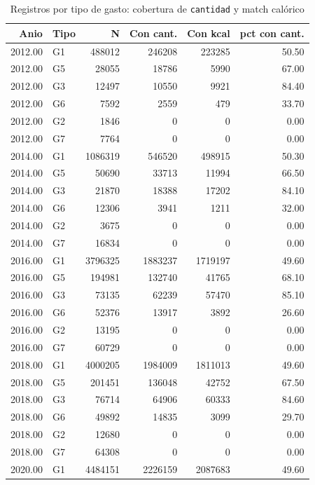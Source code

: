 \begin{table}[ht]
\centering
\caption{Registros por tipo de gasto: cobertura de \texttt{cantidad} y match cal\'orico} 
\label{tab:17a_tipo_gasto_cobertura}
\begin{tabular}{rlrrrr}
  \toprule
Anio & Tipo & N & Con cant. & Con kcal & pct con cant. \\ 
  \midrule
2012.00 & G1 & 488012 & 246208 & 223285 & 50.50 \\ 
  2012.00 & G5 & 28055 & 18786 & 5990 & 67.00 \\ 
  2012.00 & G3 & 12497 & 10550 & 9921 & 84.40 \\ 
  2012.00 & G6 & 7592 & 2559 & 479 & 33.70 \\ 
  2012.00 & G2 & 1846 &   0 &   0 & 0.00 \\ 
  2012.00 & G7 & 7764 &   0 &   0 & 0.00 \\ 
  2014.00 & G1 & 1086319 & 546520 & 498915 & 50.30 \\ 
  2014.00 & G5 & 50690 & 33713 & 11994 & 66.50 \\ 
  2014.00 & G3 & 21870 & 18388 & 17202 & 84.10 \\ 
  2014.00 & G6 & 12306 & 3941 & 1211 & 32.00 \\ 
  2014.00 & G2 & 3675 &   0 &   0 & 0.00 \\ 
  2014.00 & G7 & 16834 &   0 &   0 & 0.00 \\ 
  2016.00 & G1 & 3796325 & 1883237 & 1719197 & 49.60 \\ 
  2016.00 & G5 & 194981 & 132740 & 41765 & 68.10 \\ 
  2016.00 & G3 & 73135 & 62239 & 57470 & 85.10 \\ 
  2016.00 & G6 & 52376 & 13917 & 3892 & 26.60 \\ 
  2016.00 & G2 & 13195 &   0 &   0 & 0.00 \\ 
  2016.00 & G7 & 60729 &   0 &   0 & 0.00 \\ 
  2018.00 & G1 & 4000205 & 1984009 & 1811013 & 49.60 \\ 
  2018.00 & G5 & 201451 & 136048 & 42752 & 67.50 \\ 
  2018.00 & G3 & 76714 & 64906 & 60333 & 84.60 \\ 
  2018.00 & G6 & 49892 & 14835 & 3099 & 29.70 \\ 
  2018.00 & G2 & 12680 &   0 &   0 & 0.00 \\ 
  2018.00 & G7 & 64308 &   0 &   0 & 0.00 \\ 
  2020.00 & G1 & 4484151 & 2226159 & 2087683 & 49.60 \\ 

\end{tabular}
\end{table}
